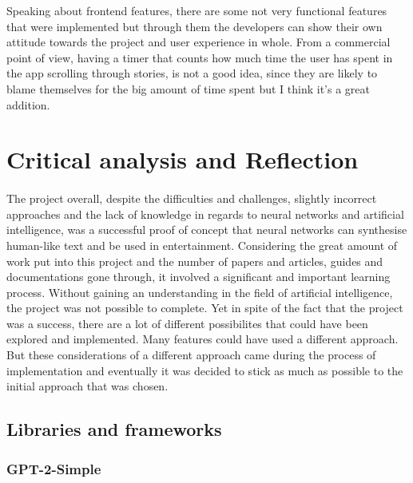 \documentclass[12pt]{report}
\begin{document}
Speaking about frontend features, there are some not very functional features that were implemented but through them
the developers can show their own attitude towards the project and user experience in whole. From a commercial point of view,
having a timer that counts how much time the user has spent in the app scrolling through stories, is not a good idea,
since they are likely to blame themselves for the big amount of time spent but I think it's a great addition.

\clearpage

\section*{Critical analysis and Reflection}
\paragraph{}
The project overall, despite the difficulties and challenges, slightly incorrect approaches and the lack of knowledge
in regards to neural networks and artificial intelligence, was a successful proof of concept that neural networks can
synthesise human-like text and be used in entertainment. Considering the great amount of work put into this project and
the number of papers and articles, guides and documentations gone through, it involved a significant and important learning process.
Without gaining an understanding in the field of artificial intelligence, the project was not possible to complete. Yet
in spite of the fact that the project was a success, there are a lot of different possibilites that could have been
explored and implemented. Many features could have used a different approach. But these considerations of a different approach 
came during the process of implementation and eventually it was decided to stick as much as possible to the initial approach that was chosen.

\subsection*{Libraries and frameworks}
\subsubsection*{GPT-2-Simple}
\end{document}
